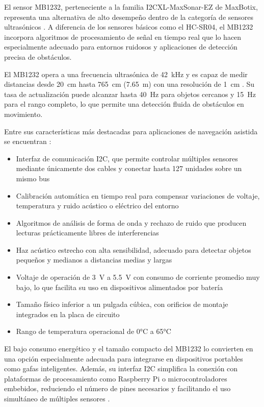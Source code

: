 El sensor MB1232, perteneciente a la familia I2CXL-MaxSonar-EZ de MaxBotix, representa una alternativa de alto desempeño dentro de la categoría de sensores ultrasónicos \cite{mb1232_datasheet}. A diferencia de los sensores básicos como el HC-SR04, el MB1232 incorpora algoritmos de procesamiento de señal en tiempo real que lo hacen especialmente adecuado para entornos ruidosos y aplicaciones de detección precisa de obstáculos.

El MB1232 opera a una frecuencia ultrasónica de 42~kHz y es capaz de medir distancias desde 20~cm hasta 765~cm (7.65~m) con una resolución de 1~cm \cite{mb1232_datasheet}. Su tasa de actualización puede alcanzar hasta 40~Hz para objetos cercanos y 15~Hz para el rango completo, lo que permite una detección fluida de obstáculos en movimiento.

Entre sus características más destacadas para aplicaciones de navegación asistida se encuentran \cite{mb1232_datasheet}:

\begin{itemize}
\item Interfaz de comunicación I2C, que permite controlar múltiples sensores mediante únicamente dos cables y conectar hasta 127 unidades sobre un mismo bus
\item Calibración automática en tiempo real para compensar variaciones de voltaje, temperatura y ruido acústico o eléctrico del entorno
\item Algoritmos de análisis de forma de onda y rechazo de ruido que producen lecturas prácticamente libres de interferencias
\item Haz acústico estrecho con alta sensibilidad, adecuado para detectar objetos pequeños y medianos a distancias medias y largas
\item Voltaje de operación de 3~V a 5.5~V con consumo de corriente promedio muy bajo, lo que facilita su uso en dispositivos alimentados por batería
\item Tamaño físico inferior a un pulgada cúbica, con orificios de montaje integrados en la placa de circuito
\item Rango de temperatura operacional de 0°C a 65°C
\end{itemize}

El bajo consumo energético y el tamaño compacto del MB1232 lo convierten en una opción especialmente adecuada para integrarse en dispositivos portables como gafas inteligentes. Además, su interfaz I2C simplifica la conexión con plataformas de procesamiento como Raspberry Pi o microcontroladores embebidos, reduciendo el número de pines necesarios y facilitando el uso simultáneo de múltiples sensores \cite{mb1232_datasheet}.

